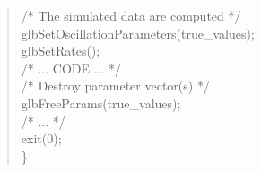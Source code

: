 {\begin{quote}
{{     \hspace*{0.5cm}  
   /* The simulated data are computed */ \\
   \hspace*{0.5cm} glbSetOscillationParameters(true\_values); \\
   \hspace*{0.5cm} glbSetRates(); \\
   
  \hspace*{0.5cm} /* ... CODE ... */ \\
  
\hspace*{0.5cm}  /* Destroy parameter vector(s) */ \\
\hspace*{0.5cm}  glbFreeParams(true\_values); \\
\hspace*{0.5cm} /* ... */ \\
 
  \hspace*{0.5cm}   exit(0); \\
\} 
}}
\end{quote}

}

